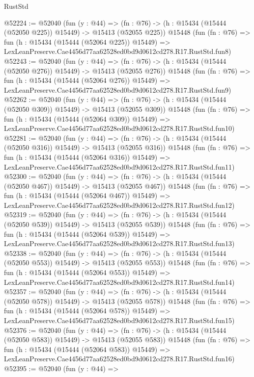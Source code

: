 \begin{lexlean}{RustStd}
\begin{coremodule}
@52224 := @52040
    (fun (y : @44) =>
    (fn : @76) -> (h : @15434 (@15444 (@52050 @225)) @15449) -> @15413 (@52055 @225))
    @15448
    (fun (fn : @76) =>
    fun (h : @15434 (@15444 (@52064 @225)) @15449) =>
    LexLeanPreserve.Cae4456d77aa62528ed0bd9d0612cd278.R17.RustStd.fun8)
@52243 := @52040
    (fun (y : @44) =>
    (fn : @76) -> (h : @15434 (@15444 (@52050 @276)) @15449) -> @15413 (@52055 @276))
    @15448
    (fun (fn : @76) =>
    fun (h : @15434 (@15444 (@52064 @276)) @15449) =>
    LexLeanPreserve.Cae4456d77aa62528ed0bd9d0612cd278.R17.RustStd.fun9)
@52262 := @52040
    (fun (y : @44) =>
    (fn : @76) -> (h : @15434 (@15444 (@52050 @309)) @15449) -> @15413 (@52055 @309))
    @15448
    (fun (fn : @76) =>
    fun (h : @15434 (@15444 (@52064 @309)) @15449) =>
    LexLeanPreserve.Cae4456d77aa62528ed0bd9d0612cd278.R17.RustStd.fun10)
@52281 := @52040
    (fun (y : @44) =>
    (fn : @76) -> (h : @15434 (@15444 (@52050 @316)) @15449) -> @15413 (@52055 @316))
    @15448
    (fun (fn : @76) =>
    fun (h : @15434 (@15444 (@52064 @316)) @15449) =>
    LexLeanPreserve.Cae4456d77aa62528ed0bd9d0612cd278.R17.RustStd.fun11)
@52300 := @52040
    (fun (y : @44) =>
    (fn : @76) -> (h : @15434 (@15444 (@52050 @467)) @15449) -> @15413 (@52055 @467))
    @15448
    (fun (fn : @76) =>
    fun (h : @15434 (@15444 (@52064 @467)) @15449) =>
    LexLeanPreserve.Cae4456d77aa62528ed0bd9d0612cd278.R17.RustStd.fun12)
@52319 := @52040
    (fun (y : @44) =>
    (fn : @76) -> (h : @15434 (@15444 (@52050 @539)) @15449) -> @15413 (@52055 @539))
    @15448
    (fun (fn : @76) =>
    fun (h : @15434 (@15444 (@52064 @539)) @15449) =>
    LexLeanPreserve.Cae4456d77aa62528ed0bd9d0612cd278.R17.RustStd.fun13)
@52338 := @52040
    (fun (y : @44) =>
    (fn : @76) -> (h : @15434 (@15444 (@52050 @553)) @15449) -> @15413 (@52055 @553))
    @15448
    (fun (fn : @76) =>
    fun (h : @15434 (@15444 (@52064 @553)) @15449) =>
    LexLeanPreserve.Cae4456d77aa62528ed0bd9d0612cd278.R17.RustStd.fun14)
@52357 := @52040
    (fun (y : @44) =>
    (fn : @76) -> (h : @15434 (@15444 (@52050 @578)) @15449) -> @15413 (@52055 @578))
    @15448
    (fun (fn : @76) =>
    fun (h : @15434 (@15444 (@52064 @578)) @15449) =>
    LexLeanPreserve.Cae4456d77aa62528ed0bd9d0612cd278.R17.RustStd.fun15)
@52376 := @52040
    (fun (y : @44) =>
    (fn : @76) -> (h : @15434 (@15444 (@52050 @583)) @15449) -> @15413 (@52055 @583))
    @15448
    (fun (fn : @76) =>
    fun (h : @15434 (@15444 (@52064 @583)) @15449) =>
    LexLeanPreserve.Cae4456d77aa62528ed0bd9d0612cd278.R17.RustStd.fun16)
@52395 := @52040
    (fun (y : @44) =>

\end{coremodule}
\end{lexlean}
